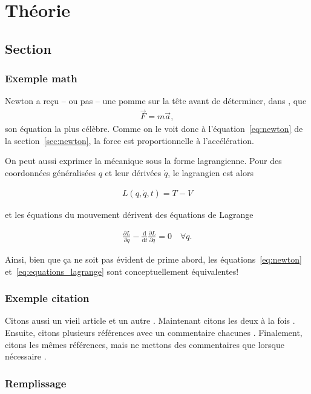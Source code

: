 \begin{comment}
\end{comment}

\chapter{Théorie}


\section{Section}
\subsection{Exemple math \label{sec:newton}}

Newton a reçu -- ou pas -- une pomme sur la tête avant de déterminer, dans \cite{newton1687philosophiae}, que
\begin{align}
    \label{eq:newton}
    \vec F=m \vec a,
\end{align}
son équation la plus célèbre. Comme on le voit donc à l'équation~\eqref{eq:newton} de la section~\ref{sec:newton}, la force est proportionnelle à l'accélération.

On peut aussi exprimer la mécanique sous la forme lagrangienne. Pour des coordonnées généralisées $q$ et leur dérivées $\dot q$, le lagrangien est alors

\begin{align}
    \label{eq:lagrangien}
    L(q, \dot q, t) = T - V
\end{align}

et les équations du mouvement dérivent des équations de Lagrange 

\begin{align}
    \label{eq:equations_lagrange}
    \frac{\partial L}{\partial q} - \frac{\mathrm{d}}{\mathrm{d}t}\frac{\partial L}{\partial \dot q} = 0 \quad \forall q
    .   %
\end{align}

Ainsi, bien que ça ne soit pas évident de prime abord, les équations~\eqref{eq:newton} et~\eqref{eq:equations_lagrange} sont conceptuellement équivalentes!

\subsection{Exemple citation}
Citons aussi un vieil article \cite{andreev1964} et un autre \cite{robertson1929}. Maintenant citons les deux à la fois \cite{andreev1964, robertson1929}. Ensuite, citons plusieurs références avec un commentaire chacunes \cites[p.~1]{robertson1929}[chap.~2]{andreev1964}[]{newton1687philosophiae}. Finalement, citons les mêmes références, mais ne mettons des commentaires que lorsque nécessaire \cites{robertson1929}[chap.~2]{andreev1964}{newton1687philosophiae}.

\subsection{Remplissage}
\kant[8-10]

